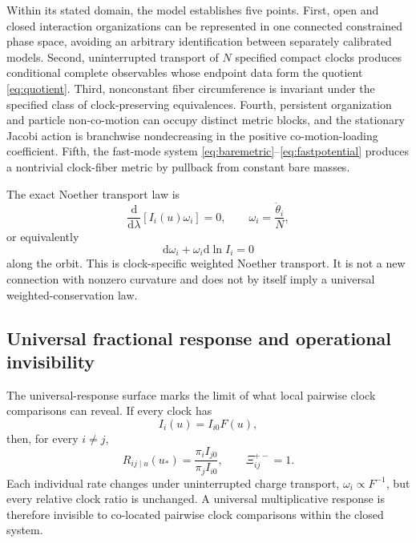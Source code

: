 \documentclass[11pt]{article}
\theoremstyle{plain}
\newcommand{\dd}{\mathrm d}
\begin{document}
Within its stated domain, the model establishes five points.  First, open and
closed interaction organizations can be represented in one connected
constrained phase space, avoiding an arbitrary identification between
separately calibrated models.  Second, uninterrupted transport of $N$
specified compact clocks produces conditional complete observables whose
endpoint data form the quotient \eqref{eq:quotient}.  Third, nonconstant fiber
circumference is invariant under the specified class of clock-preserving
equivalences.  Fourth, persistent organization and particle non-co-motion can
occupy distinct metric blocks, and the stationary Jacobi action is branchwise
nondecreasing in the positive co-motion-loading coefficient.  Fifth, the
fast-mode system \eqref{eq:baremetric}--\eqref{eq:fastpotential} produces a
nontrivial clock-fiber metric by pullback from constant bare masses.

The exact Noether transport law is
\begin{equation}
\frac{\dd}{\dd\lambda}[I_i(u)\omega_i]=0,\qquad\omega_i=\frac{\dot\theta_i}{N},
\end{equation}
or equivalently
\begin{equation}
\dd\omega_i+\omega_i\dd\ln I_i=0
\end{equation}
along the orbit. This is clock-specific weighted Noether transport. It is not a new connection with nonzero curvature and does not by itself imply a universal weighted-conservation law.

\subsection{Universal fractional response and operational invisibility}
\label{sec:universal}

The universal-response surface marks the limit of what local pairwise clock
comparisons can reveal.  If every clock has
\begin{equation}
I_i(u)=I_{i0}F(u),
\end{equation}
then, for every $i\ne j$,
\begin{equation}
R_{ij\mid u}(u_*)=\frac{\pi_iI_{j0}}{\pi_jI_{i0}},
\qquad
\Xi_{ij}^{+-}=1.
\end{equation}
Each individual rate changes under uninterrupted charge transport,
$\omega_i\propto F^{-1}$, but every relative clock ratio is unchanged.  A
universal multiplicative response is therefore invisible to co-located
pairwise clock comparisons within the closed system.
\end{document}

